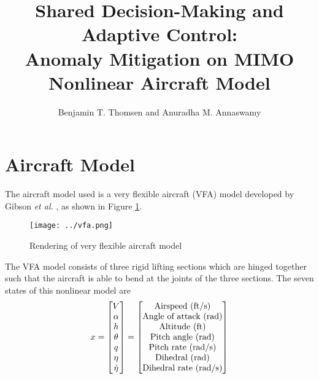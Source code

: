 \documentclass[english]{IEEEtran}
\title{\huge{Shared Decision-Making and Adaptive Control:\\ Anomaly Mitigation on MIMO Nonlinear Aircraft Model}}
\author{Benjamin T. Thomsen and Anuradha M. Annaswamy}
\begin{document}
\maketitle

\section{Aircraft Model}
The aircraft model used is a very flexible aircraft (VFA) model developed by Gibson \textit{et al.} \cite{gibson2011}, as shown in Figure \ref{fig:vfa}. 
\begin{figure}[htbp]
	\centering
	\texttt{[image: ../vfa.png]}
	\caption{Rendering of very flexible aircraft model}
	\label{fig:vfa}
\end{figure}

The VFA model consists of three rigid lifting sections which are hinged together such that the aircraft is able to bend at the joints of the three sections. The seven states of this nonlinear model are
\begin{equation}
x = \begin{bmatrix}
V \\
\alpha \\
h \\
\theta \\
q\\
\eta\\
\dot{\eta}
\end{bmatrix} =
\begin{bmatrix}
	 $Airspeed (ft/s)$\\ $Angle of attack (rad)$\\ $Altitude (ft)$\\ $Pitch angle (rad)$\\ $Pitch rate (rad/s)$\\ $Dihedral (rad)$\\ $Dihedral rate (rad/s)$
\end{bmatrix}
\end{equation}
\end{document}
